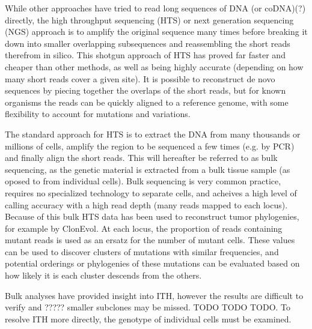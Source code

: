 \documentclass[../../main.tex]{subfiles}
\begin{document}
While other approaches have tried to read long sequences of DNA (or coDNA)(?) directly, the high throughput sequencing (HTS) or next generation sequencing (NGS) approach is to amplify the original sequence many times before breaking it down into smaller overlapping subsequences and reassembling the short reads therefrom in silico.
This shotgun approach of HTS has proved far faster and cheaper than other methods, as well as being highly accurate (depending on how many short reads cover a given site).
It is possible to reconstruct de novo sequences by piecing together the overlaps of the short reads, but for known organisms the reads can be quickly aligned to a reference genome, with some flexibility to account for mutations and variations.

The standard approach for HTS is to extract the DNA from many thousands or millions of cells, amplify the region to be sequenced a few times (e.g. by PCR) and finally align the short reads. This will hereafter be referred to as bulk sequencing, as the genetic material is extracted from a bulk tissue sample (as oposed to from individual cells).
Bulk sequencing is very common practice, requires no specialized technology to separate cells, and acheives a high level of calling accuracy with a high read depth (many reads mapped to each locus).
Because of this bulk HTS data has been used to reconstruct tumor phylogenies, for example by ClonEvol.
At each locus, the proportion of reads containing mutant reads is used as an ersatz for the number of mutant cells.
These values can be used to discover clusters of mutations with similar frequencies, and potential orderings or phylogenies of these mutations can be evaluated based on how likely it is each cluster descends from the others.

Bulk analyses have provided insight into ITH, however the results are difficult to verify and ????? smaller subclones may be missed. TODO TODO TODO.
To resolve ITH more directly, the genotype of individual cells must be examined.
\end{document}
